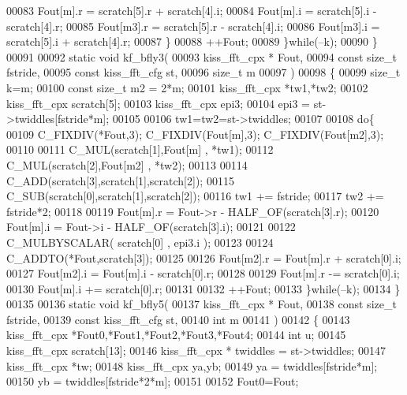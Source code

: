 \begin{DoxyCode}
00083             Fout[m].r = scratch[5].r + scratch[4].i;
00084             Fout[m].i = scratch[5].i - scratch[4].r;
00085             Fout[m3].r = scratch[5].r - scratch[4].i;
00086             Fout[m3].i = scratch[5].i + scratch[4].r;
00087         \}
00088         ++Fout;
00089     \}\textcolor{keywordflow}{while}(--k);
00090 \}
00091 
00092 \textcolor{keyword}{static} \textcolor{keywordtype}{void} kf_bfly3(
00093          kiss_fft_cpx * Fout,
00094          \textcolor{keyword}{const} \textcolor{keywordtype}{size\_t} fstride,
00095          \textcolor{keyword}{const} kiss_fft_cfg st,
00096          \textcolor{keywordtype}{size\_t} m
00097          )
00098 \{
00099      \textcolor{keywordtype}{size\_t} k=m;
00100      \textcolor{keyword}{const} \textcolor{keywordtype}{size\_t} m2 = 2*m;
00101      kiss_fft_cpx *tw1,*tw2;
00102      kiss_fft_cpx scratch[5];
00103      kiss_fft_cpx epi3;
00104      epi3 = st->twiddles[fstride*m];
00105 
00106      tw1=tw2=st->twiddles;
00107 
00108      \textcolor{keywordflow}{do}\{
00109          C_FIXDIV(*Fout,3); C_FIXDIV(Fout[m],3); C_FIXDIV(Fout[m2],3);
00110 
00111          C_MUL(scratch[1],Fout[m] , *tw1);
00112          C_MUL(scratch[2],Fout[m2] , *tw2);
00113 
00114          C_ADD(scratch[3],scratch[1],scratch[2]);
00115          C_SUB(scratch[0],scratch[1],scratch[2]);
00116          tw1 += fstride;
00117          tw2 += fstride*2;
00118 
00119          Fout[m].r = Fout->r - HALF_OF(scratch[3].r);
00120          Fout[m].i = Fout->i - HALF_OF(scratch[3].i);
00121 
00122          C_MULBYSCALAR( scratch[0] , epi3.i );
00123 
00124          C_ADDTO(*Fout,scratch[3]);
00125 
00126          Fout[m2].r = Fout[m].r + scratch[0].i;
00127          Fout[m2].i = Fout[m].i - scratch[0].r;
00128 
00129          Fout[m].r -= scratch[0].i;
00130          Fout[m].i += scratch[0].r;
00131 
00132          ++Fout;
00133      \}\textcolor{keywordflow}{while}(--k);
00134 \}
00135 
00136 \textcolor{keyword}{static} \textcolor{keywordtype}{void} kf_bfly5(
00137         kiss_fft_cpx * Fout,
00138         \textcolor{keyword}{const} \textcolor{keywordtype}{size\_t} fstride,
00139         \textcolor{keyword}{const} kiss_fft_cfg st,
00140         \textcolor{keywordtype}{int} m
00141         )
00142 \{
00143     kiss_fft_cpx *Fout0,*Fout1,*Fout2,*Fout3,*Fout4;
00144     \textcolor{keywordtype}{int} u;
00145     kiss_fft_cpx scratch[13];
00146     kiss_fft_cpx * twiddles = st->twiddles;
00147     kiss_fft_cpx *tw;
00148     kiss_fft_cpx ya,yb;
00149     ya = twiddles[fstride*m];
00150     yb = twiddles[fstride*2*m];
00151 
00152     Fout0=Fout;

\end{DoxyCode}
